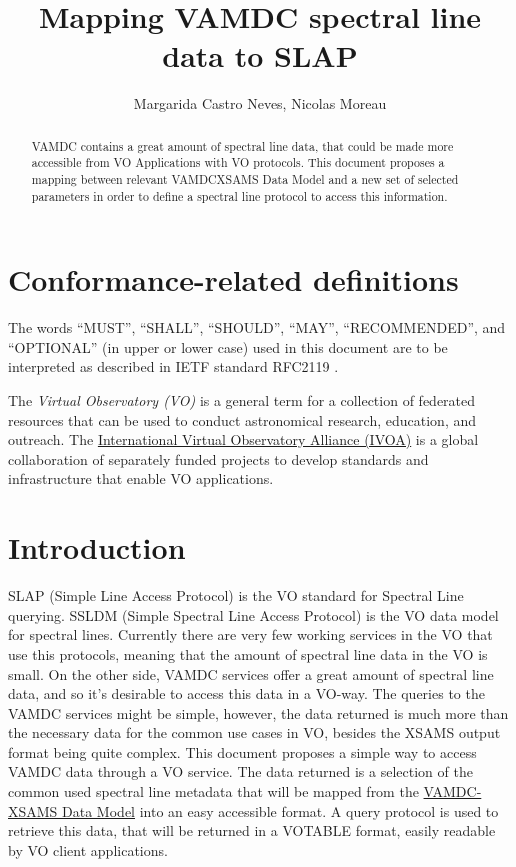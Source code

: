 \documentclass[11pt,a4paper]{ivoa}
\title{Mapping VAMDC spectral line data to SLAP}
\author{Margarida Castro Neves, Nicolas Moreau}
\begin{document}
\begin{abstract}
VAMDC contains  a great amount of spectral line data, that could be made more
accessible from VO Applications with VO protocols. This document proposes a mapping
between relevant VAMDCXSAMS Data Model and a new set of selected parameters  in
order to define a spectral line protocol to access this information.


\end{abstract}




\section*{Conformance-related definitions}

The words ``MUST'', ``SHALL'', ``SHOULD'', ``MAY'', ``RECOMMENDED'', and
``OPTIONAL'' (in upper or lower case) used in this document are to be
interpreted as described in IETF standard RFC2119 \citep{std:RFC2119}.

The \emph{Virtual Observatory (VO)} is a
general term for a collection of federated resources that can be used
to conduct astronomical research, education, and outreach.
The \href{http://www.ivoa.net}{International
Virtual Observatory Alliance (IVOA)} is a global
collaboration of separately funded projects to develop standards and
infrastructure that enable VO applications.


\section{Introduction}

SLAP (Simple Line Access Protocol)\citep{2010ivoa.specQ1209O} is the VO standard for Spectral Line querying. SSLDM (Simple Spectral Line Access Protocol)\citep{2010ivoa.spec.1209O} is the VO data model for spectral lines.
Currently there are very few working services in the VO that use this protocols, meaning that the amount of spectral line data in the VO is small. 
On the other side, VAMDC services offer a great amount of spectral line data, and  so it's desirable to access this data in a VO-way. 
The queries to the VAMDC services might be simple, however, the data returned is much more than the necessary data for the common use cases in VO, besides the XSAMS \citep{XSAMS:Docs} output format being quite complex.
This document proposes a simple way to access VAMDC data through a VO service. The data returned is a selection of the common used spectral line metadata that will be mapped from the \href{https://standards.vamdc.eu/#data-model}{VAMDC-XSAMS Data Model} into an easy accessible format. A query protocol is used  to retrieve this data,  that will be returned in a VOTABLE format, easily readable by VO client applications.
\end{document}
